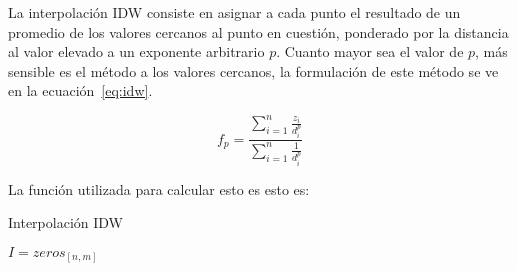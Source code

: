 La interpolación IDW consiste en asignar a cada punto el resultado de un
promedio de los valores cercanos al punto en cuestión, ponderado por la
distancia al valor elevado a un exponente arbitrario $p$.
%
Cuanto mayor sea el valor de $p$, más sensible es el método a los valores
cercanos, la formulación de este método se ve en la ecuación~\ref{eq:idw}.

\begin{equation}
    f_p = \frac{\sum_{i=1}^{n} \frac{z_i}{d_i^p}} {\sum_{i=1}^{n}
    \frac{1}{d_i^p}}
    \label{eq:idw}
\end{equation}

La función utilizada para calcular esto es esto es:

\begin{algorithm}
    \caption{Interpolación IDW}\label{algo:IDW}
    \SetAlgoLined



    \BlankLine
    $I=zeros_{[n,m]}$\;
\end{algorithm}


